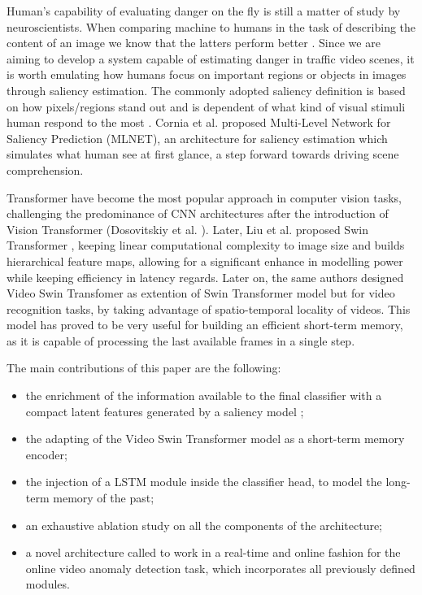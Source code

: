 Human's capability of evaluating danger on the fly is still a matter of study by neuroscientists.
When comparing machine to humans in the task of describing the content of an image we know that the latters perform better \cite{jiang2015salicon}.
Since we are aiming to develop a system capable of estimating danger in traffic video scenes, it is worth emulating how humans focus on important regions or objects in images through saliency estimation.
The commonly adopted saliency definition is based on how pixels/regions stand out and is dependent of what kind of visual stimuli human respond to the most \cite{yan2013hierachical}.
Cornia et al.\cite{cornia2016saliency} proposed Multi-Level Network for Saliency Prediction (MLNET), an architecture for saliency estimation which simulates what human see at first glance, a step forward towards driving scene comprehension.

Transformer have become the most popular approach in computer vision tasks, challenging the predominance of CNN architectures after the introduction of Vision Transformer (Dosovitskiy et al. \cite{DBLP:conf/iclr/DosovitskiyB0WZ21}).
Later, Liu et al. proposed Swin Transformer \cite{liu2021Swin}, keeping linear computational complexity to image size and builds hierarchical feature maps, allowing for a significant enhance in modelling power while keeping efficiency in latency regards.
Later on, the same authors designed Video Swin Transfomer \cite{liu_video_2022} as extention of Swin Transformer model but for video recognition tasks, by taking advantage of spatio-temporal locality of videos.
This model has proved to be very useful for building an efficient short-term memory, as it is capable of processing the last available frames in a single step.


The main contributions of this paper are the following:
\begin{itemize}
    \item the enrichment of the information available to the final classifier with a compact latent features generated by a saliency model \cite{cornia2016deep};
    \item the adapting of the Video Swin Transformer model \cite{liu_video_2022} as a short-term memory encoder;
    \item the injection of a LSTM module inside the classifier head, to model the long-term memory of the past;
    \item an exhaustive ablation study on all the components of the architecture;
    \item a novel architecture called  to work in a real-time and online fashion for the online video anomaly detection task, which incorporates all previously defined modules.
\end{itemize}

